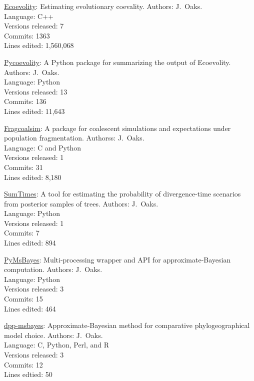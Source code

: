 \myHangIndent
\href{https://github.com/phyletica/ecoevolity}{Ecoevolity}:
    Estimating evolutionary coevality.
    Authors: J.\ Oaks. \\
    Language: C++ \\
    Versions released: 7 \\
    Commits: 1363 \\
    Lines edited: 1,560,068

\myHangIndent
\href{https://github.com/phyletica/sumcoevolity}{Pycoevolity}:
    A Python package for summarizing the output of Ecoevolity.
    Authors: J.\ Oaks. \\
    Language: Python \\
    Versions released: 13 \\
    Commits: 136 \\
    Lines edited: 11,643

\myHangIndent
\href{https://github.com/joaks1/fragcoalsim}{Fragcoalsim}:
    A package for coalescent simulations and expectations under population
    fragmentation.
    Authorss: J.\ Oaks. \\
    Language: C and Python \\
    Versions released: 1 \\
    Commits: 31 \\
    Lines edited: 8,180

\myHangIndent
\href{https://github.com/phyletica/SumTimes}{SumTimes}:
    A tool for estimating the probability of divergence-time scenarios from
    posterior samples of trees.
    Authors: J.\ Oaks. \\
    Language: Python \\
    Versions released: 1 \\
    Commits: 7 \\
    Lines edited: 894

\myHangIndent
\href{https://github.com/joaks1/PyMsBayes}{PyMsBayes}:
    Multi-processing wrapper and API for approximate-Bayesian
    computation.
    Authors: J.\ Oaks. \\
    Language: Python \\
    Versions released: 3 \\
    Commits: 15 \\
    Lines edited: 464

\myHangIndent
\href{https://github.com/joaks1/dpp-msbayes}{dpp-msbayes}:
    Approximate-Bayesian method for comparative phylogeographical model choice.
    Authors: J.\ Oaks. \\
    Language: C, Python, Perl, and R \\
    Versions released: 3 \\
    Commits: 12 \\
    Lines edtied: 50

